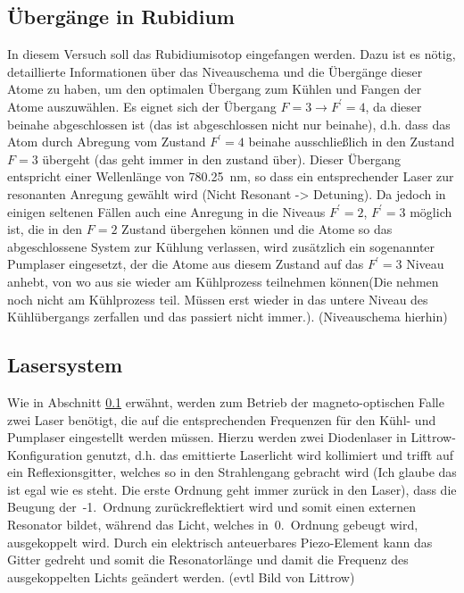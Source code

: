 \documentclass[11pt, a4paper]{article}
\numberwithin{equation}{section}
\newcommand{\korr}[1]{{\color{red}(#1)}}
\begin{document}
\subsection{Übergänge in Rubidium}
\label{sec:rb_uebergaenge}

In diesem Versuch soll das Rubidiumisotop  eingefangen werden.
Dazu ist es nötig, detaillierte Informationen über das Niveauschema und die Übergänge dieser Atome zu haben, um den optimalen Übergang zum Kühlen und Fangen der Atome auszuwählen.
Es eignet sich der Übergang $F=3 \rightarrow F^\prime=4$, da dieser beinahe abgeschlossen ist \korr{das ist abgeschlossen nicht nur beinahe}, d.h. dass das Atom durch Abregung vom Zustand $F^\prime=4$ beinahe ausschließlich in den Zustand $F=3$ übergeht \korr{das geht immer in den zustand über}.
Dieser Übergang entspricht einer Wellenlänge von \SI{780.25}{nm}, so dass ein entsprechender Laser zur resonanten Anregung gewählt wird \korr{Nicht Resonant -> Detuning}.
Da jedoch in einigen seltenen Fällen auch eine Anregung in die Niveaus $F^\prime=2$, $F^\prime=3$ möglich ist, die in den $F=2$ Zustand übergehen können und die Atome so das abgeschlossene System zur Kühlung verlassen, wird zusätzlich ein sogenannter Pumplaser eingesetzt, der die Atome aus diesem Zustand auf das $F^\prime=3$ Niveau anhebt, von wo aus sie wieder am Kühlprozess teilnehmen können\korr{Die nehmen noch nicht am Kühlprozess teil. Müssen erst wieder in das untere Niveau des Kühlübergangs zerfallen und das passiert nicht immer.}.
\korr{Niveauschema hierhin} 

\subsection{Lasersystem}

Wie in Abschnitt \ref{sec:rb_uebergaenge} erwähnt, werden zum Betrieb der magneto-optischen Falle zwei Laser benötigt, die auf die entsprechenden Frequenzen für den Kühl- und Pumplaser eingestellt werden müssen.
Hierzu werden zwei Diodenlaser in Littrow-Konfiguration genutzt, d.h. das emittierte Laserlicht wird kollimiert und trifft auf ein Reflexionsgitter, welches so in den Strahlengang gebracht wird \korr{Ich glaube das ist egal wie es steht. Die erste Ordnung geht immer zurück in den Laser}, dass die Beugung der~-1.~Ordnung zurückreflektiert wird und somit einen externen Resonator bildet, während das Licht, welches in~0.~Ordnung gebeugt wird, ausgekoppelt wird.
Durch ein elektrisch anteuerbares Piezo-Element kann das Gitter gedreht und somit die Resonatorlänge und damit die Frequenz des ausgekoppelten Lichts geändert werden.
\korr{evtl Bild von Littrow}
\end{document}
